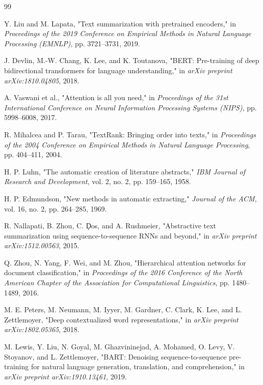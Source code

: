 \documentclass[conference]{IEEEtran}
\begin{document}
\begin{thebibliography}{99}

 Y. Liu and M. Lapata, "Text summarization with pretrained encoders," in \textit{Proceedings of the 2019 Conference on Empirical Methods in Natural Language Processing (EMNLP)}, pp. 3721--3731, 2019.

 J. Devlin, M.-W. Chang, K. Lee, and K. Toutanova, "BERT: Pre-training of deep bidirectional transformers for language understanding," in \textit{arXiv preprint arXiv:1810.04805}, 2018.

 A. Vaswani et al., "Attention is all you need," in \textit{Proceedings of the 31st International Conference on Neural Information Processing Systems (NIPS)}, pp. 5998--6008, 2017.

 R. Mihalcea and P. Tarau, "TextRank: Bringing order into texts," in \textit{Proceedings of the 2004 Conference on Empirical Methods in Natural Language Processing}, pp. 404--411, 2004.

 H. P. Luhn, "The automatic creation of literature abstracts," \textit{IBM Journal of Research and Development}, vol. 2, no. 2, pp. 159--165, 1958.

 H. P. Edmundson, "New methods in automatic extracting," \textit{Journal of the ACM}, vol. 16, no. 2, pp. 264--285, 1969.

 R. Nallapati, B. Zhou, C. {\c{D}}os, and A. Rushmeier, "Abstractive text summarization using sequence-to-sequence RNNs and beyond," in \textit{arXiv preprint arXiv:1512.00563}, 2015.

 Q. Zhou, N. Yang, F. Wei, and M. Zhou, "Hierarchical attention networks for document classification," in \textit{Proceedings of the 2016 Conference of the North American Chapter of the Association for Computational Linguistics}, pp. 1480--1489, 2016.

 M. E. Peters, M. Neumann, M. Iyyer, M. Gardner, C. Clark, K. Lee, and L. Zettlemoyer, "Deep contextualized word representations," in \textit{arXiv preprint arXiv:1802.05365}, 2018.

 M. Lewis, Y. Liu, N. Goyal, M. Ghazvininejad, A. Mohamed, O. Levy, V. Stoyanov, and L. Zettlemoyer, "BART: Denoising sequence-to-sequence pre-training for natural language generation, translation, and comprehension," in \textit{arXiv preprint arXiv:1910.13461}, 2019.


\end{thebibliography}
\end{document}
